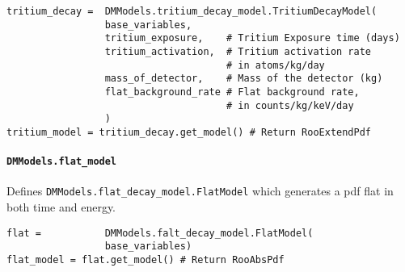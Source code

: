 				\begin{lstlisting}			
tritium_decay =  DMModels.tritium_decay_model.TritiumDecayModel(
                 base_variables,     
                 tritium_exposure,    # Tritium Exposure time (days) 
                 tritium_activation,  # Tritium activation rate 
                                      # in atoms/kg/day 
                 mass_of_detector,    # Mass of the detector (kg)
                 flat_background_rate # Flat background rate, 
                                      # in counts/kg/keV/day
                 )
tritium_model = tritium_decay.get_model() # Return RooExtendPdf
				\end{lstlisting}				

			\paragraph{\lstinline!DMModels.flat_model!}
Defines \lstinline!DMModels.flat_decay_model.FlatModel! which generates a pdf flat in both time and energy. 

				\begin{lstlisting}			
flat =           DMModels.falt_decay_model.FlatModel(
                 base_variables)     
flat_model = flat.get_model() # Return RooAbsPdf
				\end{lstlisting}				

